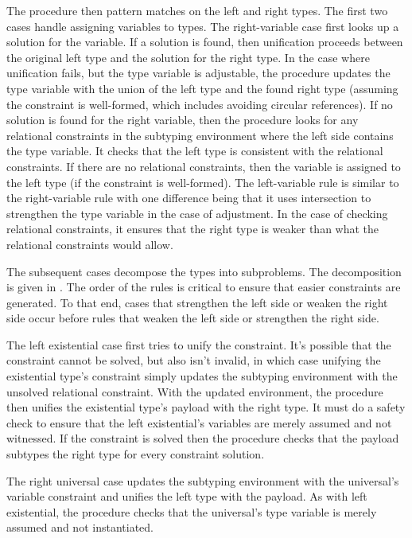 \documentclass[acmsmall]{acmart}
\theoremstyle{definition}
\begin{document}
The procedure then pattern matches on the left and right types. 
The first two cases handle assigning variables to types.
The right-variable case first looks up a solution  
for the variable. If a solution is found, then unification proceeds
between the original left type and the solution for the right type.
In the case where unification fails, but the type variable is adjustable,
the procedure updates the type variable with the union of the left type
and the found right type (assuming the constraint is well-formed, 
which includes avoiding circular references). 
If no solution is found for the right variable, then 
the procedure looks for any relational constraints in the subtyping environment
where the left side contains the type variable.
It checks that the left type is consistent with the relational constraints. 
If there are no relational constraints, then the variable is assigned
to the left type (if the constraint is well-formed).
The left-variable rule is similar to the right-variable rule with
one difference being that it uses intersection to strengthen the type variable 
in the case of adjustment. In the case of checking relational constraints, it
ensures that the right type is weaker than what the relational constraints would allow. 

The subsequent cases decompose the types into subproblems. 
The decomposition is given in . 
The order of the rules 
is critical to ensure that easier constraints are generated. To that end, cases that
strengthen the left side or weaken the right side occur before rules that
weaken the left side or strengthen the right side.

The left existential case first tries to unify the constraint. It's possible that the
constraint cannot be solved, but also isn't invalid, in which case unifying the existential type's constraint 
simply updates the subtyping environment with the unsolved relational constraint. 
With the updated environment, the procedure then unifies the existential type's payload with the right type.
It must do a safety check to ensure that 
the left existential's variables are merely assumed and not witnessed. 
If the constraint is solved then the procedure 
checks that the payload subtypes the right type for every constraint solution.

The right universal case updates the subtyping environment with the universal's variable constraint
and unifies the left type with the payload. As with left existential, the procedure checks that
the universal's type variable is merely assumed and not instantiated.
\end{document}
